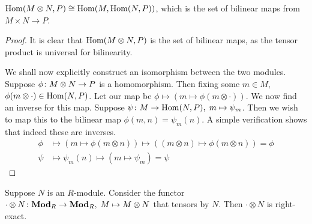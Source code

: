 \begin{lemma}\label{lem:tensor-hom-equivalence}
    \(\operatorname{Hom}(M \otimes N, P) \cong \operatorname{Hom}(M,\operatorname{Hom}(N,P))\),
    which is the set of bilinear maps from \(M \times N \to P\).
\end{lemma}
\begin{proof}
    It is clear that \(\operatorname{Hom}(M \otimes N, P)\) is the set of bilinear maps,
    as the tensor product is universal for bilinearity.
    
    We shall now explicitly construct an isomorphism between the two modules.
    Suppose \(\phi\colon M \otimes N\to P\) is a homomorphism.
    Then fixing some \(m \in M\), \(\phi(m\otimes\cdot) \in \operatorname{Hom}(N,P)\).
    Let our map be \(\phi \mapsto (m \mapsto \phi(m\otimes\cdot))\).
    We now find an inverse for this map.
    Suppose \(\psi\colon M\to\operatorname{Hom}(N,P),\;m\mapsto\psi_m\).
    Then we wish to map this to the bilinear map \(\phi(m,n) = \psi_m(n)\).
    A simple verification shows that indeed these are inverses.
    \begin{align*}
        \phi &\mapsto (m \mapsto \phi(m \otimes n)) \mapsto ((m \otimes n) \mapsto \phi(m \otimes n)) = \phi \\
        \psi &\mapsto \psi_m(n) \mapsto (m \mapsto \psi_m) = \psi
    \end{align*}
\end{proof}
\begin{theorem}\label{thm:tensor-right-exact}
    Suppose \(N\) is an \(R\)-module.
    Consider the functor \(\cdot\otimes N\colon\textbf{Mod}_R\to\textbf{Mod}_R,\;M\mapsto M \otimes N\)
    that tensors by \(N\).
    Then \(\cdot\otimes N\) is right-exact.
\end{theorem}
